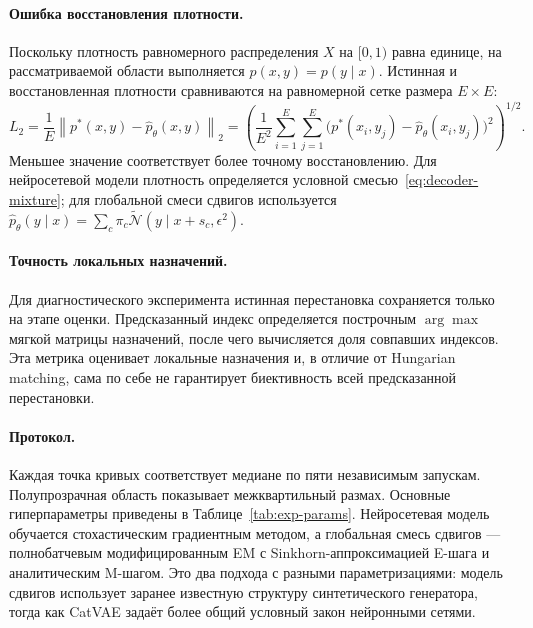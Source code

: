\paragraph{Ошибка восстановления плотности.}
Поскольку плотность равномерного распределения $X$ на $[0,1)$ равна единице, на
рассматриваемой области выполняется $p(x,y)=p(y\mid x)$. Истинная и восстановленная
плотности сравниваются на равномерной сетке размера $E\times E$:
\begin{equation}
L_2=\frac{1}{E}\left\|p^*(x,y)-\widehat p_\theta(x,y)\right\|_2
=\left(
\frac{1}{E^2}\sum_{i=1}^{E}\sum_{j=1}^{E}
\bigl(p^*(x_i,y_j)-\widehat p_\theta(x_i,y_j)\bigr)^2
\right)^{1/2}.
\label{eq:l2-metric}
\end{equation}
Меньшее значение соответствует более точному восстановлению. Для нейросетевой модели
плотность определяется условной смесью~\eqref{eq:decoder-mixture}; для глобальной смеси
сдвигов используется
$\widehat p_\theta(y\mid x)=\sum_c\pi_c
\tilde{\mathcal{N}}(y\mid x+s_c,\epsilon^2)$.

\paragraph{Точность локальных назначений.}
Для диагностического эксперимента истинная перестановка сохраняется только на этапе оценки.
Предсказанный индекс определяется построчным $\arg\max$ мягкой матрицы назначений, после
чего вычисляется доля совпавших индексов. Эта метрика оценивает локальные назначения и, в
отличие от Hungarian matching, сама по себе не гарантирует биективность всей предсказанной
перестановки.

\paragraph{Протокол.}
Каждая точка кривых соответствует медиане по пяти независимым запускам. Полупрозрачная
область показывает межквартильный размах. Основные гиперпараметры приведены в
Таблице~\ref{tab:exp-params}. Нейросетевая модель обучается стохастическим градиентным
методом, а глобальная смесь сдвигов --- полнобатчевым модифицированным EM с
Sinkhorn-аппроксимацией E-шага и аналитическим M-шагом. Это два подхода с разными
параметризациями: модель сдвигов использует заранее известную структуру синтетического
генератора, тогда как CatVAE задаёт более общий условный закон нейронными сетями.

